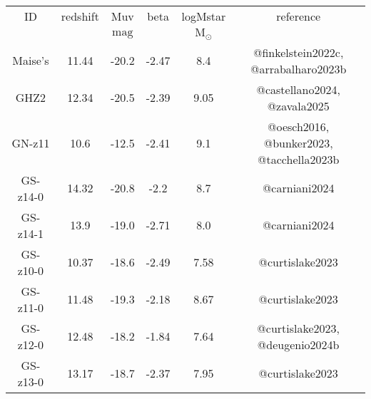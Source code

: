 \begin{table}
\begin{tabular}{cccccc}
ID & redshift & Muv & beta & logMstar & reference \\
 &  & $\mathrm{mag}$ &  & $\mathrm{M_{\odot}}$ &  \\
Maise's & 11.44 & -20.2 & -2.47 & 8.4 & @finkelstein2022c, @arrabalharo2023b \\
GHZ2 & 12.34 & -20.5 & -2.39 & 9.05 & @castellano2024, @zavala2025 \\
GN-z11 & 10.6 & -12.5 & -2.41 & 9.1 & @oesch2016, @bunker2023, @tacchella2023b \\
GS-z14-0 & 14.32 & -20.8 & -2.2 & 8.7 & @carniani2024 \\
GS-z14-1 & 13.9 & -19.0 & -2.71 & 8.0 & @carniani2024 \\
GS-z10-0 & 10.37 & -18.6 & -2.49 & 7.58 & @curtislake2023 \\
GS-z11-0 & 11.48 & -19.3 & -2.18 & 8.67 & @curtislake2023 \\
GS-z12-0 & 12.48 & -18.2 & -1.84 & 7.64 & @curtislake2023, @deugenio2024b \\
GS-z13-0 & 13.17 & -18.7 & -2.37 & 7.95 & @curtislake2023 \\
\end{tabular}
\end{table}
